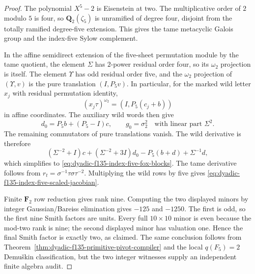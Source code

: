 \begin{proof}
The polynomial
$X^5-2$ is
Eisenstein at
two.  The
multiplicative
order of $2$
modulo $5$
is four, so
$\mathbf Q_2(\zeta_5)$
is unramified
of degree four,
disjoint from
the totally ramified
degree-five
extension.
This gives
the tame metacyclic
Galois group and
the index-five
Sylow complement.

In the affine
semidirect extension
of the five-sheet
permutation module
by the tame quotient,
the element $\Sigma$
has $2$-power
residual order four,
so its $\omega_2$
projection is itself.
The element
$\Upsilon$ has
odd residual order
five, and the
$\omega_2$
projection of
$(\Upsilon,v)$
is the pure
translation
$(I,P_5v)$.
In particular,
for the marked
wild letter $x_j$
with residual
permutation identity,
\[
(x_j\tau)^{\omega_2}
=(I,P_5(c_j+b))
\]
in affine coordinates.
The auxiliary wild
words then give
\[
d_0=P_5b+(P_5-I)c,\qquad
g_0=\sigma_2^2
\quad\text{with
linear part }\Sigma^2.
\]
The remaining
commutators of
pure translations
vanish.
The wild
derivative is
therefore
\[
(\Sigma^{-2}+I)c+
(\Sigma^{-2}+3I)d_0
-P_5(b+d)
+\Sigma^{-1}d,
\]
which simplifies
to
\eqref{eq:dyadic-f135-index-five-fox-blocks}.
The tame
derivative follows
from
$r_t=\sigma^{-1}\tau
\sigma\tau^{-2}$.
Multiplying
the wild rows by
five gives
\eqref{eq:dyadic-f135-index-five-scaled-jacobian}.

Finite
$\mathbf F_2$
row reduction
gives rank nine.
Computing the
two displayed
minors by
integer
Gaussian/Bareiss
elimination gives
$-125$ and
$-1250$.
The first is odd,
so the first nine
Smith factors
are units.
Every full
$10\times10$
minor is even
because the
mod-two rank
is nine;
the second
displayed minor
has valuation
one.
Hence the final
Smith factor is
exactly two,
as claimed.
The same conclusion
follows from
Theorem~\ref{thm:dyadic-f135-primitive-pivot-compiler}
and the local
$q(F_5)=2$
Demu\v{s}kin
classification,
but the two
integer witnesses
supply an
independent
finite algebra
audit.
\end{proof}

